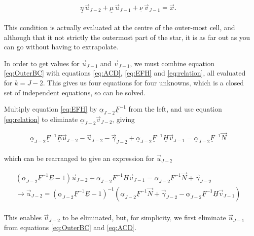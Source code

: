 \documentclass[11pt]{amsart}
\begin{document}
\begin{equation} \label{eq:OuterBC}
\underline{\eta} \, \vec{u}_{J-2} + \underline{\mu} \, \vec{u}_{J-1} + \underline{\nu} \, \vec{v}_{J-1} = \vec{x} .
\end{equation}
\\
This condition is actually evaluated at the centre of the outer-most cell, and although that it not strictly the outermost part of the star, it is as far out as you can go without having to extrapolate.

In order to get values for $\vec{u}_{J-1}$ and $\vec{v}_{J-1}$, we must combine equation \ref{eq:OuterBC} with equations \ref{eq:ACD}, \ref{eq:EFH} and \ref{eq:relation}, all evaluated for $k = J-2$.  This gives us four equations for four unknowns, which is a closed set of independent equations, so can be solved.

Multiply equation \ref{eq:EFH} by $\underline{\alpha}_{J-2} \underline{F}^{-1}$ from the left, and use equation \ref{eq:relation} to eliminate $\underline{\alpha}_{J-2} \vec{v}_{J-2}$, giving

\begin{equation} \label{eq:BCa}
\underline{\alpha}_{J-2} \underline{F}^{-1} \underline{E} \vec{u}_{J-2}  -  \vec{u}_{J-2}  -  \vec{\gamma}_{J-2}  +  \underline{\alpha}_{J-2} \underline{F}^{-1} \underline{H} \vec{v}_{J-1}  =  \underline{\alpha}_{J-2} \underline{F}^{-1} \vec{N}
\end{equation} 
\\

which can be rearranged to give an expression for $\vec{u}_{J-2}$


\begin{multline} \label{eq:BCa}
\left(  \underline{\alpha}_{J-2} \underline{F}^{-1} \underline{E}  -  1  \right)  \vec{u}_{J-2}   +  \underline{\alpha}_{J-2} \underline{F}^{-1} \underline{H} \vec{v}_{J-1}  =  \underline{\alpha}_{J-2} \underline{F}^{-1} \vec{N}  +  \vec{\gamma}_{J-2} 
\\ \longrightarrow
\vec{u}_{J-2} = \left(  \underline{\alpha}_{J-2} \underline{F}^{-1} \underline{E}  -  1  \right)^{-1}   \left(  \underline{\alpha}_{J-2} \underline{F}^{-1} \vec{N}  +  \vec{\gamma}_{J-2}  -   \underline{\alpha}_{J-2} \underline{F}^{-1} \underline{H} \vec{v}_{J-1}  \right)
\end{multline} 
\\

This enables $\vec{u}_{J-2}$ to be eliminated, but, for simplicity, we first eliminate $\vec{u}_{J-1}$ from equations \ref{eq:OuterBC} and \ref{eq:ACD}.
\end{document}
